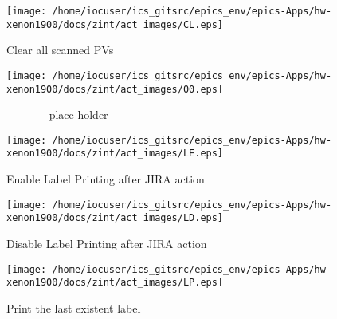 \noindent
\vspace{1.4cm}
\begin{minipage}{.2\textwidth}
\begin{center}
\texttt{[image: /home/iocuser/ics\_gitsrc/epics\_env/epics-Apps/hw-xenon1900/docs/zint/act\_images/CL.eps]}
\end{center}
\end{minipage}
\begin{minipage}{.7\textwidth}
Clear all scanned PVs
\end{minipage}


\noindent
\vspace{1.4cm}
\begin{minipage}{.2\textwidth}
\begin{center}
\texttt{[image: /home/iocuser/ics\_gitsrc/epics\_env/epics-Apps/hw-xenon1900/docs/zint/act\_images/00.eps]}
\end{center}
\end{minipage}
\begin{minipage}{.7\textwidth}
----------- place holder ----------
\end{minipage}


\noindent
\vspace{1.4cm}
\begin{minipage}{.2\textwidth}
\begin{center}
\texttt{[image: /home/iocuser/ics\_gitsrc/epics\_env/epics-Apps/hw-xenon1900/docs/zint/act\_images/LE.eps]}
\end{center}
\end{minipage}
\begin{minipage}{.7\textwidth}
Enable Label Printing after JIRA action
\end{minipage}


\noindent
\vspace{1.4cm}
\begin{minipage}{.2\textwidth}
\begin{center}
\texttt{[image: /home/iocuser/ics\_gitsrc/epics\_env/epics-Apps/hw-xenon1900/docs/zint/act\_images/LD.eps]}
\end{center}
\end{minipage}
\begin{minipage}{.7\textwidth}
Disable Label Printing after JIRA action
\end{minipage}


\noindent
\vspace{1.4cm}
\begin{minipage}{.2\textwidth}
\begin{center}
\texttt{[image: /home/iocuser/ics\_gitsrc/epics\_env/epics-Apps/hw-xenon1900/docs/zint/act\_images/LP.eps]}
\end{center}
\end{minipage}
\begin{minipage}{.7\textwidth}
Print the last existent label
\end{minipage}


